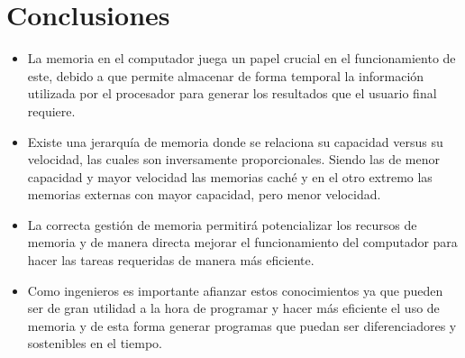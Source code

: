 \documentclass{article}
\begin{document}
\section{Conclusiones} \label{conclusion}
\begin{itemize}
  \item La memoria en el computador juega un papel crucial en el funcionamiento de este, debido a que permite almacenar de forma temporal la información utilizada por el procesador para generar los resultados que el usuario final requiere.
  \item Existe una jerarquía de memoria donde se relaciona su capacidad versus su velocidad, las cuales son inversamente proporcionales. Siendo las de menor capacidad y mayor velocidad las memorias caché y en el otro extremo las memorias externas con mayor capacidad, pero menor velocidad.
  \item La correcta gestión de memoria permitirá potencializar los recursos de memoria y de manera directa mejorar el funcionamiento del computador para hacer las tareas requeridas de manera más eficiente.
  \item Como ingenieros es importante afianzar estos conocimientos ya que pueden ser de gran utilidad a la hora de programar y hacer más eficiente el uso de memoria y de esta forma generar programas que puedan ser diferenciadores y sostenibles en el tiempo.
\end{itemize}



\end{document}
